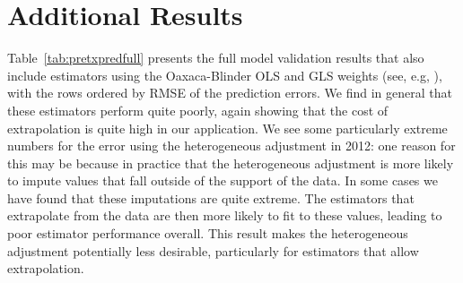 \section{Additional Results}\label{app:allresults}

Table~\ref{tab:pretxpredfull} presents the full model validation results that also include estimators using the Oaxaca-Blinder OLS and GLS weights (see, e.g, \cite{kline2011oaxaca}), with the rows ordered by RMSE of the prediction errors. We find in general that these estimators perform quite poorly, again showing that the cost of extrapolation is quite high in our application. We see some particularly extreme numbers for the error using the heterogeneous adjustment in 2012: one reason for this may be because in practice that the heterogeneous adjustment is more likely to impute values that fall outside of the support of the data. In some cases we have found that these imputations are quite extreme. The estimators that extrapolate from the data are then more likely to fit to these values, leading to poor estimator performance overall. This result makes the heterogeneous adjustment potentially less desirable, particularly for estimators that allow extrapolation.


